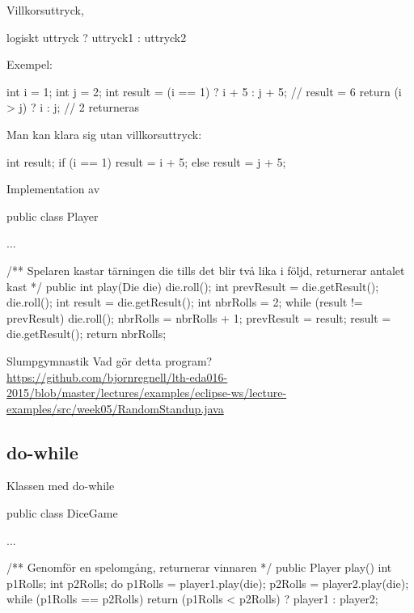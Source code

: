 \documentclass{lecturenotes}
\begin{document}
\begin{Slide}{Villkorsuttryck, }
\begin{Code}
logiskt uttryck ? uttryck1 : uttryck2
\end{Code}

Exempel:
\begin{Code}
int i = 1;
int j = 2;
int result = (i == 1) ? i + 5 : j + 5; // result = 6
return (i > j) ? i : j;                // 2 returneras
\end{Code}

Man kan klara sig utan villkorsuttryck:
\begin{Code}
int result;
if (i == 1) {
    result = i + 5;
} else {
    result = j + 5;
}
\end{Code}
\end{Slide} 

\begin{Slide}{Implementation av }
\begin{Code}
public class Player {
    ...
    
    /** Spelaren kastar tärningen die tills det blir 
        två lika i följd, returnerar antalet kast */
    public int play(Die die) {
        die.roll();
        int prevResult = die.getResult();
        die.roll();
        int result = die.getResult();
        int nbrRolls = 2;
        while (result != prevResult) {
            die.roll();
            nbrRolls = nbrRolls + 1;
            prevResult = result;
            result = die.getResult();
        }
        return nbrRolls;
    }
}
\end{Code}
\end{Slide} 


\begin{Slide}{Slumpgymnastik}
Vad gör detta program? \\
\url{https://github.com/bjornregnell/lth-eda016-2015/blob/master/lectures/examples/eclipse-ws/lecture-examples/src/week05/RandomStandup.java}
\end{Slide}

\subsection{do-while}
\begin{Slide}
{Klassen  med do-while}
\begin{Code}
public class DiceGame {
    ...
    
    /** Genomför en spelomgång, returnerar vinnaren */
    public Player play() {
        int p1Rolls;
        int p2Rolls;
        do  {
            p1Rolls = player1.play(die);
            p2Rolls = player2.play(die);
        } while (p1Rolls == p2Rolls)
        return (p1Rolls < p2Rolls) ?  player1 : player2;
    }
}
\end{Code}
\end{Slide} 
\end{document}
